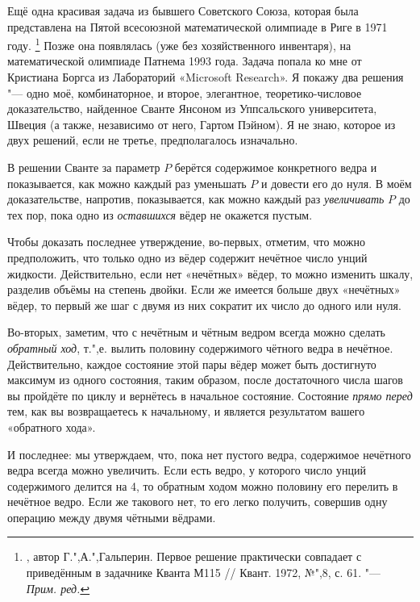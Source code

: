 \documentclass[twoside]{book}
\begin{document}
Ещё одна красивая задача из бывшего Советского Союза, которая была представлена на Пятой всесоюзной математической олимпиаде в Риге в 1971 году.%
\footnote{\cite[№148]{ВсМО}, автор Г.",А.",Гальперин.
Первое решение практически совпадает с приведённым в задачнике Кванта М115 /\!/ {Квант}. 1972, №",8, с. 61. "--- \emph{Прим. ред.}}
Позже она появлялась (уже без хозяйственного инвентаря), на математической олимпиаде Патнема 1993 года.
Задача попала ко мне от Кристиана Боргса из Лабораторий «Microsoft Research». %
Я покажу два решения "--- одно моё, комбинаторное, и второе, элегантное, теоретико-числовое доказательство, найденное Сванте Янсоном из Уппсальского университета, Швеция %
(а также, независимо от него, Гартом Пэйном). %
Я не знаю, которое из двух решений, если не третье, предполагалось изначально.

\medskip

В решении Сванте за параметр $P$ берётся содержимое конкретного ведра и показывается, как можно каждый раз уменьшать $P$ и довести его до нуля.
В моём доказательстве, напротив, показывается, как можно каждый раз \emph{увеличивать} $P$ до тех пор, пока одно из \emph{оставшихся} вёдер не окажется пустым.

Чтобы доказать последнее утверждение, во-первых, отметим, что можно предположить, что только одно из вёдер содержит нечётное число унций жидкости.
Действительно, если нет «нечётных» вёдер, то можно изменить шкалу, разделив объёмы на степень двойки.
Если же имеется больше двух «нечётных» вёдер, то первый же шаг с двумя из них сократит их число до одного или нуля.

Во-вторых, заметим, что с нечётным и чётным ведром всегда можно сделать \emph{обратный ход}, т.",е. вылить половину содержимого чётного ведра в нечётное.
Действительно, каждое состояние этой пары вёдер может быть достигнуто максимум из одного состояния, таким образом, после достаточного числа шагов вы пройдёте по циклу и вернётесь в начальное состояние.
Состояние \emph{прямо перед} тем, как вы возвращаетесь к начальному, и является результатом вашего «обратного хода».

И последнее: мы утверждаем, что, пока нет пустого ведра, содержимое нечётного ведра всегда можно увеличить.
Если есть ведро, у которого число унций содержимого делится на 4, то обратным ходом можно половину его перелить в нечётное ведро.
Если же такового нет, то его легко получить, совершив одну операцию между двумя чётными вёдрами.
\heart
\end{document}
